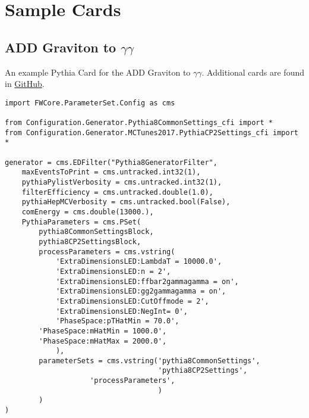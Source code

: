 \chapter{Sample Cards}
\RaggedRight \parindent=25pt
\label{ch:appendix_sample_cards}
\section{ADD Graviton to $\gamma\gamma$}
An example Pythia Card for the ADD Graviton to $\gamma\gamma$. 
Additional cards are found in \href{https://github.com/uzzielperez/Analyses/tree/master/Analysis_v1/Simulation/Pythia}{GitHub}.

\begin{singlespace}
\begin{small}
\begin{verbatim}
import FWCore.ParameterSet.Config as cms 

from Configuration.Generator.Pythia8CommonSettings_cfi import *
from Configuration.Generator.MCTunes2017.PythiaCP2Settings_cfi import *

generator = cms.EDFilter("Pythia8GeneratorFilter",
    maxEventsToPrint = cms.untracked.int32(1),
    pythiaPylistVerbosity = cms.untracked.int32(1),
    filterEfficiency = cms.untracked.double(1.0),
    pythiaHepMCVerbosity = cms.untracked.bool(False),
    comEnergy = cms.double(13000.),
    PythiaParameters = cms.PSet(
        pythia8CommonSettingsBlock,
        pythia8CP2SettingsBlock,
        processParameters = cms.vstring(
            'ExtraDimensionsLED:LambdaT = 10000.0',
            'ExtraDimensionsLED:n = 2',
            'ExtraDimensionsLED:ffbar2gammagamma = on',
            'ExtraDimensionsLED:gg2gammagamma = on',
            'ExtraDimensionsLED:CutOffmode = 2', 
            'ExtraDimensionsLED:NegInt= 0',
            'PhaseSpace:pTHatMin = 70.0',
	    'PhaseSpace:mHatMin = 1000.0',	    
	    'PhaseSpace:mHatMax = 2000.0', 
            ),  
        parameterSets = cms.vstring('pythia8CommonSettings',
                                    'pythia8CP2Settings', 
				    'processParameters',
                                    )   
        )   
)
\end{verbatim}
\end{small}
\end{singlespace}


